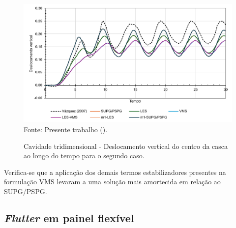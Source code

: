 \begin{figure}[h!]
    \centering
    \caption{Cavidade tridimensional - Deslocamento vertical do centro da casca ao longo do tempo para o segundo caso.}
    \includegraphics[width=\linewidth]{Figuras/FSI-Cavity3D/FSI-cavity3D.pdf}
    \\Fonte: Presente trabalho (\the\year).
    \label{fig:Cavity3D-rescoarse}
\end{figure}

Verifica-se que a aplicação dos demais termos estabilizadores presentes na formulação VMS levaram a uma solução mais amortecida em relação ao SUPG/PSPG.

\newpage
\subsection{\textit{Flutter} em painel flexível} \label{FSI-prism}

